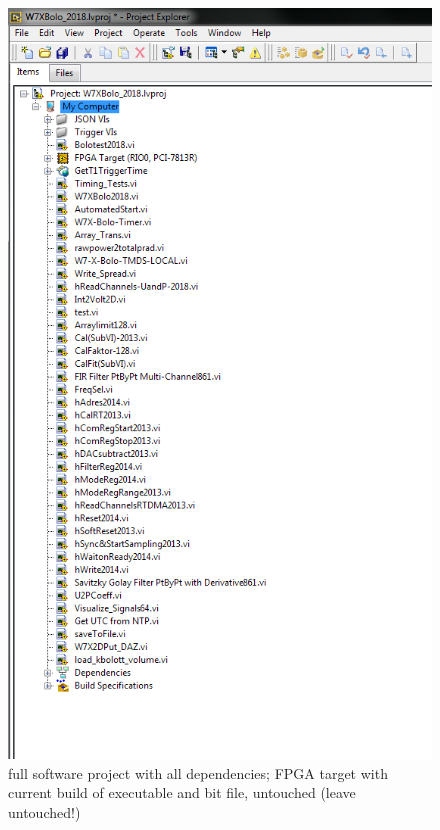 \documentclass{beamer}
\begin{document}
  \begin{frame}%
    \begin{columns}
        \begin{figure}%
          \centering%
          \includegraphics[height=0.8\textheight]{figures/content/project.png}%
          \caption{\tiny%
                   full software project with all dependencies; FPGA target %
                   with current build of executable and bit file, untouched %
                   (leave untouched!)}%

\end{figure}
\end{columns}
\end{frame}
\end{document}

